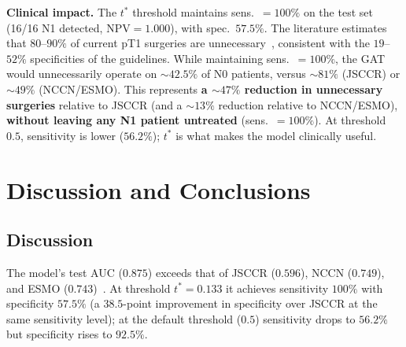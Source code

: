 \documentclass[10pt,a4paper,twocolumn,twoside]{article}
\begin{document}
\textbf{Clinical impact.} The $t^*$ threshold maintains sens.\ $=100\%$ on the test set (16/16 N1
detected, $\text{NPV}\!=\!1.000$), with spec.\ $57.5\%$. The literature estimates that
$80$–$90\%$ of current pT1 surgeries are unnecessary~\cite{MartinezDeJuan2024},
consistent with the $19$–$52\%$ specificities of the guidelines. While maintaining sens.\ $=100\%$, the
GAT would unnecessarily operate on $\sim\!42.5\%$ of N0 patients, versus $\sim\!81\%$
(JSCCR) or $\sim\!49\%$ (NCCN/ESMO). This represents \textbf{a $\sim\!47\%$ reduction in
unnecessary surgeries} relative to JSCCR (and a $\sim\!13\%$ reduction relative to NCCN/ESMO),
\textbf{without leaving any N1 patient untreated} (sens.\ $=100\%$). At threshold $0.5$,
sensitivity is lower ($56.2\%$); $t^*$ is what makes the model clinically useful.

%

\section{Discussion and Conclusions}

\subsection{Discussion}

The model's test AUC ($0.875$) exceeds that of JSCCR ($0.596$), NCCN ($0.749$), and
ESMO ($0.743$)~\cite{tanino2024comparative}. At threshold $t^*\!=\!0.133$ it achieves
sensitivity $100\%$ with specificity $57.5\%$ (a $38.5$-point
improvement in specificity over JSCCR at the same sensitivity level); at the default threshold
($0.5$) sensitivity drops to $56.2\%$ but specificity rises to $92.5\%$.
\end{document}
